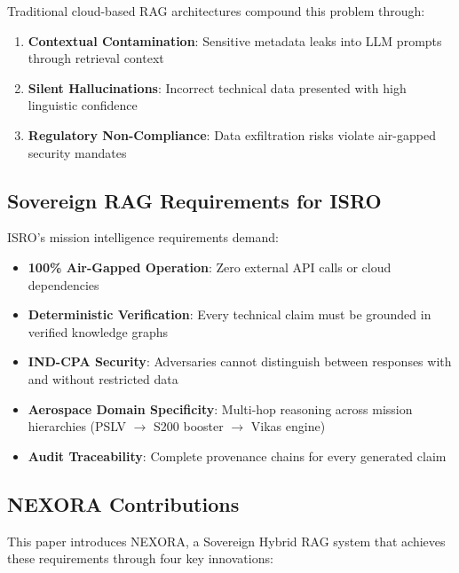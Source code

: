 \documentclass[journal,12pt,twocolumn]{IEEEtran}
\begin{document}
Traditional cloud-based RAG architectures compound this problem through:
\begin{enumerate}
\item \textbf{Contextual Contamination}: Sensitive metadata leaks into LLM prompts through retrieval context
\item \textbf{Silent Hallucinations}: Incorrect technical data presented with high linguistic confidence
\item \textbf{Regulatory Non-Compliance}: Data exfiltration risks violate air-gapped security mandates
\end{enumerate}

\subsection{Sovereign RAG Requirements for ISRO}

ISRO's mission intelligence requirements demand:
\begin{itemize}
\item \textbf{100\% Air-Gapped Operation}: Zero external API calls or cloud dependencies
\item \textbf{Deterministic Verification}: Every technical claim must be grounded in verified knowledge graphs
\item \textbf{IND-CPA Security}: Adversaries cannot distinguish between responses with and without restricted data
\item \textbf{Aerospace Domain Specificity}: Multi-hop reasoning across mission hierarchies (PSLV $\rightarrow$ S200 booster $\rightarrow$ Vikas engine)
\item \textbf{Audit Traceability}: Complete provenance chains for every generated claim
\end{itemize}

\subsection{NEXORA Contributions}

This paper introduces NEXORA, a Sovereign Hybrid RAG system that achieves these requirements through four key innovations:
\end{document}
